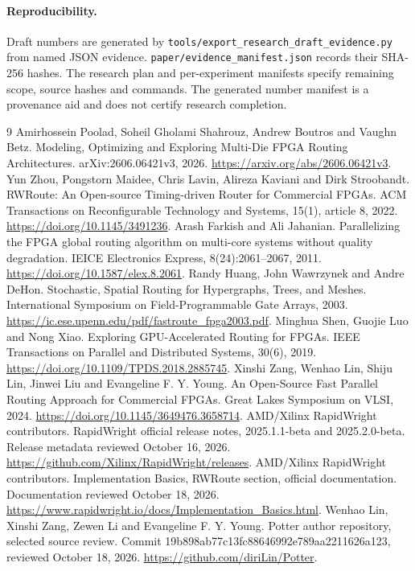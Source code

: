 \documentclass[10pt]{article}
\begin{document}
\paragraph{Reproducibility.}
Draft numbers are generated by
\texttt{tools/export\_research\_draft\_evidence.py} from named JSON evidence.
\texttt{paper/evidence\_manifest.json} records their SHA-256 hashes. The
research plan and per-experiment manifests specify remaining scope, source
hashes and commands. The generated number manifest is a provenance aid and
does not certify research completion.
\begin{thebibliography}{9}
Amirhossein Poolad, Soheil Gholami Shahrouz, Andrew Boutros and Vaughn Betz.
Modeling, Optimizing and Exploring Multi-Die FPGA Routing Architectures.
arXiv:2606.06421v3, 2026.
\url{https://arxiv.org/abs/2606.06421v3}.
Yun Zhou, Pongstorn Maidee, Chris Lavin, Alireza Kaviani and Dirk Stroobandt.
RWRoute: An Open-source Timing-driven Router for Commercial FPGAs.
ACM Transactions on Reconfigurable Technology and Systems, 15(1), article 8, 2022.
\url{https://doi.org/10.1145/3491236}.
Arash Farkish and Ali Jahanian.
Parallelizing the FPGA global routing algorithm on multi-core systems without
quality degradation. IEICE Electronics Express, 8(24):2061--2067, 2011.
\url{https://doi.org/10.1587/elex.8.2061}.
Randy Huang, John Wawrzynek and Andre DeHon.
Stochastic, Spatial Routing for Hypergraphs, Trees, and Meshes.
International Symposium on Field-Programmable Gate Arrays, 2003.
\url{https://ic.ese.upenn.edu/pdf/fastroute_fpga2003.pdf}.
Minghua Shen, Guojie Luo and Nong Xiao.
Exploring GPU-Accelerated Routing for FPGAs.
IEEE Transactions on Parallel and Distributed Systems, 30(6), 2019.
\url{https://doi.org/10.1109/TPDS.2018.2885745}.
Xinshi Zang, Wenhao Lin, Shiju Lin, Jinwei Liu and Evangeline F. Y. Young.
An Open-Source Fast Parallel Routing Approach for Commercial FPGAs.
Great Lakes Symposium on VLSI, 2024.
\url{https://doi.org/10.1145/3649476.3658714}.
AMD/Xilinx RapidWright contributors.
RapidWright official release notes, 2025.1.1-beta and 2025.2.0-beta.
Release metadata reviewed October 16, 2026.
\url{https://github.com/Xilinx/RapidWright/releases}.
AMD/Xilinx RapidWright contributors.
Implementation Basics, RWRoute section, official documentation.
Documentation reviewed October 18, 2026.
\url{https://www.rapidwright.io/docs/Implementation_Basics.html}.
Wenhao Lin, Xinshi Zang, Zewen Li and Evangeline F. Y. Young.
Potter author repository, selected source review.
Commit 19b898ab77c13fc88646992e789aa2211626a123, reviewed October 18, 2026.
\url{https://github.com/diriLin/Potter}.
\end{thebibliography}
\end{document}
